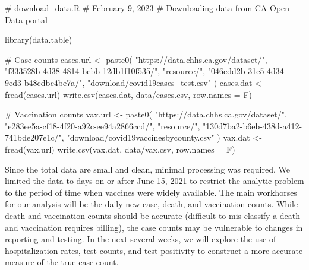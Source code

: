 \documentclass[
  11pt,
  letterpaper,
  DIV=11,
  numbers=noendperiod]{scrartcl}
\newenvironment{Shaded}{\begin{snugshade}}{\end{snugshade}}
\newcommand{\AttributeTok}[1]{\textcolor[rgb]{0.40,0.45,0.13}{#1}}
\newcommand{\CommentTok}[1]{\textcolor[rgb]{0.37,0.37,0.37}{#1}}
\newcommand{\FunctionTok}[1]{\textcolor[rgb]{0.28,0.35,0.67}{#1}}
\newcommand{\NormalTok}[1]{\textcolor[rgb]{0.00,0.23,0.31}{#1}}
\newcommand{\OtherTok}[1]{\textcolor[rgb]{0.00,0.23,0.31}{#1}}
\newcommand{\StringTok}[1]{\textcolor[rgb]{0.13,0.47,0.30}{#1}}
\begin{document}
\begin{Shaded}
\begin{Highlighting}[]
\CommentTok{\# download\_data.R}
\CommentTok{\# February 9, 2023}
\CommentTok{\# Downloading data from CA Open Data portal}

\FunctionTok{library}\NormalTok{(data.table)}

\CommentTok{\# Case counts}
\NormalTok{cases.url }\OtherTok{\textless{}{-}} \FunctionTok{paste0}\NormalTok{(}
    \StringTok{"https://data.chhs.ca.gov/dataset/"}\NormalTok{,}
    \StringTok{"f333528b{-}4d38{-}4814{-}bebb{-}12db1f10f535/"}\NormalTok{,}
    \StringTok{"resource/"}\NormalTok{,}
    \StringTok{"046cdd2b{-}31e5{-}4d34{-}9ed3{-}b48cdbc4be7a/"}\NormalTok{,}
    \StringTok{"download/covid19cases\_test.csv"}
\NormalTok{)}
\NormalTok{cases.dat }\OtherTok{\textless{}{-}} \FunctionTok{fread}\NormalTok{(cases.url)}
\FunctionTok{write.csv}\NormalTok{(cases.dat, }\StringTok{\textquotesingle{}data/cases.csv\textquotesingle{}}\NormalTok{, }\AttributeTok{row.names =}\NormalTok{ F)}

\CommentTok{\# Vaccination counts}
\NormalTok{vax.url }\OtherTok{\textless{}{-}} \FunctionTok{paste0}\NormalTok{(}
    \StringTok{"https://data.chhs.ca.gov/dataset/"}\NormalTok{,}
    \StringTok{"e283ee5a{-}cf18{-}4f20{-}a92c{-}ee94a2866ccd/"}\NormalTok{,}
    \StringTok{"resource/"}\NormalTok{,}
    \StringTok{"130d7ba2{-}b6eb{-}438d{-}a412{-}741bde207e1c/"}\NormalTok{,}
    \StringTok{"download/covid19vaccinesbycounty.csv"}
\NormalTok{)}
\NormalTok{vax.dat }\OtherTok{\textless{}{-}} \FunctionTok{fread}\NormalTok{(vax.url)}
\FunctionTok{write.csv}\NormalTok{(vax.dat, }\StringTok{\textquotesingle{}data/vax.csv\textquotesingle{}}\NormalTok{, }\AttributeTok{row.names =}\NormalTok{ F)}
\end{Highlighting}
\end{Shaded}

Since the total data are small and clean, minimal processing was
required. We limited the data to days on or after June 15, 2021 to
restrict the analytic problem to the period of time when vaccines were
widely available. The main workhorses for our analysis will be the daily
new case, death, and vaccination counts. While death and vaccination
counts should be accurate (difficult to mis-classify a death and
vaccination requires billing), the case counts may be vulnerable to
changes in reporting and testing. In the next several weeks, we will
explore the use of hospitalization rates, test counts, and test
positivity to construct a more accurate measure of the true case count.
\end{document}
